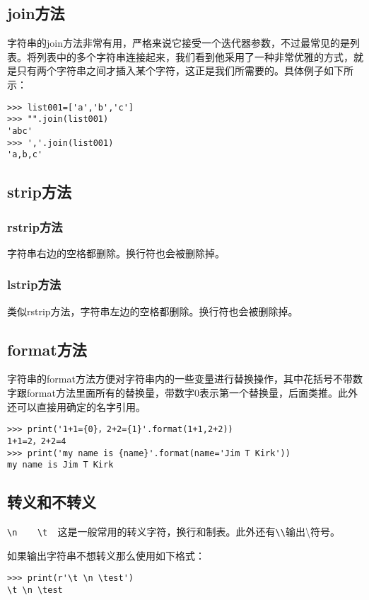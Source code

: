 \documentclass[12pt,oneside]{book}
\begin{document}
\begin{common-format}
\subsection{join方法}
字符串的join方法非常有用，严格来说它接受一个迭代器参数，不过最常见的是列表。将列表中的多个字符串连接起来，我们看到他采用了一种非常优雅的方式，就是只有两个字符串之间才插入某个字符，这正是我们所需要的。具体例子如下所示：
\begin{Verbatim}
>>> list001=['a','b','c']
>>> "".join(list001)
'abc'
>>> ','.join(list001)
'a,b,c'
\end{Verbatim}


\subsection{strip方法}

\subsubsection{rstrip方法}
字符串右边的空格都删除。换行符也会被删除掉。

\subsubsection{lstrip方法}
类似rstrip方法，字符串左边的空格都删除。换行符也会被删除掉。


\subsection{format方法}
字符串的format方法方便对字符串内的一些变量进行替换操作，其中花括号不带数字跟format方法里面所有的替换量，带数字0表示第一个替换量，后面类推。此外还可以直接用确定的名字引用。
\begin{Verbatim}
>>> print('1+1={0}，2+2={1}'.format(1+1,2+2))
1+1=2，2+2=4
>>> print('my name is {name}'.format(name='Jim T Kirk'))
my name is Jim T Kirk
\end{Verbatim}

\subsection{转义和不转义}
\verb+\n    \t  +这是一般常用的转义字符，换行和制表。此外还有\verb+\\+输出\textbackslash 符号。

如果输出字符串不想转义那么使用如下格式：
\begin{Verbatim}
>>> print(r'\t \n \test')
\t \n \test
\end{Verbatim}


\end{common-format}
\end{document}
